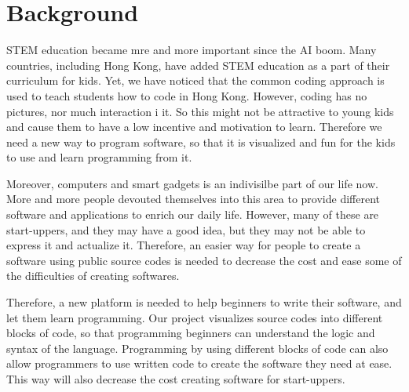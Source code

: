 \chapter{Background}
STEM education became mre and more important since the AI boom. Many countries, including Hong Kong, have added STEM education as a part of their curriculum for kids. Yet, we have noticed that the common coding approach is used to teach students how to code in Hong Kong. However, coding has no pictures, nor much interaction i it. So this might not be attractive to young kids and cause them to have a low incentive and motivation to learn. Therefore we need a new way to program software, so that it is visualized and fun for the kids to use and learn programming from it.

Moreover, computers and smart gadgets is an indivisilbe part of our life now. More and more people devouted themselves into this area to provide different software and applications to enrich our daily life. However, many of these are start-uppers, and they may have a good idea, but they may not be able to express it and actualize it. Therefore, an easier way for people to create a software using public source codes is needed to decrease the cost and ease some of the difficulties of creating softwares.

Therefore, a new platform is needed to help beginners to write their software, and let them learn programming. Our project visualizes source codes into different blocks of code, so that programming beginners can understand the logic and syntax of the language. Programming by using different blocks of code can also allow programmers to use written code to create the software they need at ease. This way will also decrease the cost creating software for start-uppers.
